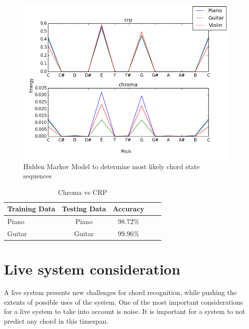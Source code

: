 \documentclass{article}
\begin{document}
\begin{figure}[ht]
\vskip 0.2in
\begin{center}
\centerline{\includegraphics[width=\columnwidth]{chromacrp}}
\caption{Hidden Markov Model to determine most likely chord state sequences}
\label{icml-historical}
\end{center}
\vskip -0.2in
\end{figure}

\begin{table}[t]
\caption{Chroma vs CRP}
\label{chromavscrp}
\vskip 0.15in
\begin{center}
\begin{small}
\begin{sc}
\begin{tabular}{lcccr}
\hline
\abovespace\belowspace
Training Data & Testing Data & Accuracy \\
\hline
\abovespace
Piano & Piano & 98.72\%\\
Guitar & Guitar & 99.96\%\\
\hline
\end{tabular}
\end{sc}
\end{small}
\end{center}
\vskip -0.1in
\end{table}

\section{Live system consideration}

A live system presents new challenges for chord recognition, while pushing the
extents of possible uses of the system.
One of the most important considerations for a live system to take into account
is noise. It is important for a system to not predict any chord in this
timespan.
\end{document}
